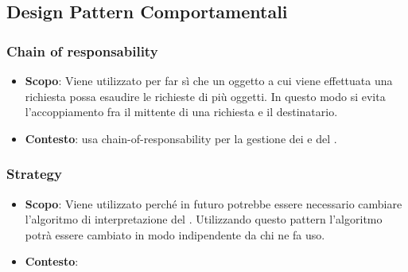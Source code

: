 \subsection{Design Pattern Comportamentali}

\subsubsection{Chain of responsability}
\label{chain-of-responsability}

\begin{itemize}

	\item \textbf{Scopo}: Viene utilizzato per far sì che un oggetto a cui viene effettuata una richiesta possa esaudire le richieste di più oggetti. In questo modo si evita l'accoppiamento fra il mittente di una richiesta e il destinatario.
	\item \textbf{Contesto}:  usa chain-of-responsability per la gestione dei  e del .

\end{itemize}

\subsubsection{Strategy}

\begin{itemize}

	\item \textbf{Scopo}: Viene utilizzato perché in futuro potrebbe essere necessario cambiare l'algoritmo di interpretazione del . Utilizzando questo pattern l'algoritmo potrà essere cambiato in modo indipendente da chi ne fa uso.
	\item \textbf{Contesto}:

\end{itemize}